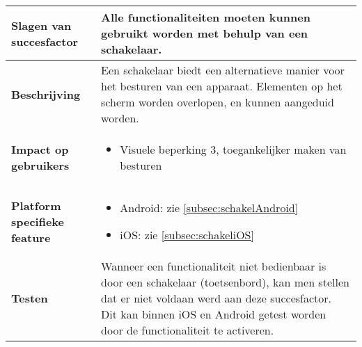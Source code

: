 \begin{table}[H]
\begin{tabular}{|l|p{12cm}|}
        \hline
        \textbf{Slagen van succesfactor}      & Alle functionaliteiten moeten kunnen gebruikt worden met behulp van een schakelaar.                                                                                                                                                                                                                                                                                                                                                          \\ 
        \hline
        \textbf{Beschrijving}                 & Een schakelaar biedt een alternatieve manier voor het besturen van een apparaat. Elementen op het scherm worden overlopen, en kunnen aangeduid worden.\\ 
        \hline
        \textbf{Impact op gebruikers}         &  
        \begin{itemize}
            \item Visuele beperking 3, toegankelijker maken van besturen
        \end{itemize}                                                                                                                                                                                                                                                                                                                                                                                                                    \\ 
        \hline
        \textbf{Platform specifieke feature}  & \begin{itemize}
            \item Android: zie \ref{subsec:schakelAndroid}
            \item iOS: zie \ref{subsec:schakeliOS}
        \end{itemize}                                                                                                                                                                                                                                                                                                                                   \\ 
        \hline
        \textbf{Testen}                       & Wanneer een functionaliteit niet bedienbaar is door een schakelaar (toetsenbord), kan men stellen dat er niet voldaan werd aan deze succesfactor. Dit kan binnen iOS en Android getest worden door de functionaliteit te activeren.                                                                                                                                                                                                                                                                     \\
        \hline
    \end{tabular}
\end{table}

